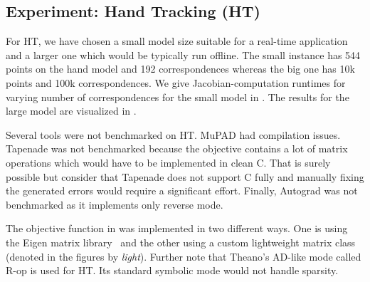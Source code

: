 \documentclass[suppldata]{article}
\begin{document}
\ifmobile\clearpage\fi

\subsection*{Experiment: Hand Tracking (HT)}

For HT, we have chosen a small model size suitable for a real-time application and a larger one which would be typically run offline. The small instance has 544 points on the hand model and 192 correspondences whereas the big one has 10k points and 100k correspondences. We give Jacobian-computation runtimes for varying number of correspondences for the small model in . The results for the large model are visualized in .

Several tools were not benchmarked on HT. MuPAD had compilation issues.  
Tapenade was not benchmarked because the objective contains a lot of matrix operations which would have to be implemented in clean C. 
That is surely possible but consider that Tapenade does not support C fully and manually fixing the generated errors would require a significant effort. 
Finally, Autograd was not benchmarked as it implements only reverse mode.

The objective function in \Cpp{} was implemented in two different ways. One is using the Eigen matrix library~\cite{eigen} and the other using a custom lightweight matrix class (denoted in the figures by \emph{light}).  Further note that Theano's AD-like mode called R-op is used for HT. Its standard symbolic mode would not handle sparsity.
\end{document}
